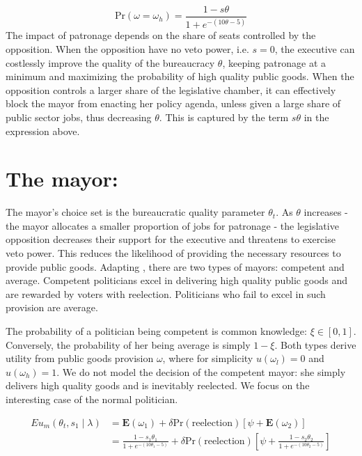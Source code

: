 \documentclass[12pt,]{book}
\begin{document}
\[\text{Pr}(\omega=\omega_h) = \frac{1-s\theta}{1+e^{-(10\theta-5)}}\]
The impact of patronage depends on the share of seats controlled by the opposition. When the opposition have no veto power, i.e. \(s=0\), the executive can costlessly improve the quality of the bureaucracy \(\theta\), keeping patronage at a minimum and maximizing the probability of high quality public goods. When the opposition controls a larger share of the legislative chamber, it can effectively block the mayor from enacting her policy agenda, unless given a large share of public sector jobs, thus decreasing \(\theta\). This is captured by the term \(s\theta\) in the expression above.

\hypertarget{the-mayor}{%
\section{The mayor:}\label{the-mayor}}

The mayor's choice set is the bureaucratic quality parameter \(\theta_t\). As \(\theta\) increases - the mayor allocates a smaller proportion of jobs for patronage - the legislative opposition decreases their support for the executive and threatens to exercise veto power. This reduces the likelihood of providing the necessary resources to provide public goods. Adapting \citet{gailmard_slackers_2007}, there are two types of mayors: competent and average. Competent politicians excel in delivering high quality public goods and are rewarded by voters with reelection. Politicians who fail to excel in such provision are average.

The probability of a politician being competent is common knowledge: \(\xi \in [0,1]\). Conversely, the probability of her being average is simply \(1 - \xi\). Both types derive utility from public goods provision \(\omega\), where for simplicity \(u(\omega_l)=0\) and \(u(\omega_h) = 1\). We do not model the decision of the competent mayor: she simply delivers high quality goods and is inevitably reelected. We focus on the interesting case of the normal politician.

\begin{align*}
Eu_m \left(\theta_t, s_1 \middle|\lambda \right) &= \textbf{E}(\omega_1) + \delta \text{Pr}(\text{reelection})\left[\psi + \textbf{E}(\omega_2)  \right] \\
&= \frac{1-s_1\theta_1}{1+e^{-(10\theta_1-5)}} + \delta \text{Pr}(\text{reelection})\left[\psi + \frac{1-s_2\theta_2}{1+e^{-(10\theta_2-5)}} \right] \\
\end{align*}
\end{document}
